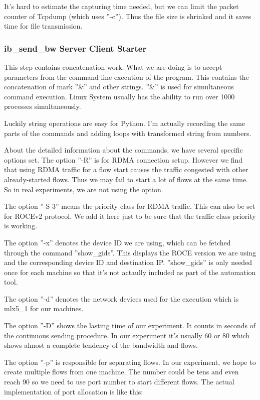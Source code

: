 \documentclass[12pt,a4paper]{article}
\begin{document}
It's hard to estimate the capturing time needed, but we can limit the packet counter of Tcpdump (which uses ''-c'').
Thus the file size is shrinked and it saves time for file transmission.

\subsubsection{ib\_send\_bw Server Client Starter}

This step contains concatenation work.
What we are doing is to accept parameters from the command line execution of the program.
This contains the concatenation of mark ''\&'' and other strings.
''\&'' is used for simultaneous command execution. Linux System usually has the ability to run over 1000 processes simultaneously.

Luckily string operations are easy for Python.
I'm actually recording the same parts of the commands and adding loops with transformed string from numbers.

About the detailed information about the commands, we have several specific options set.
The option ''-R'' is for RDMA connection setup. However we find that using RDMA traffic for a flow start causes
the traffic congested with other already-started flows. Thus we may fail to start a lot of flows at the same time.
So in real experiments, we are not using the option.

The option ''-S 3'' means the priority class for RDMA traffic. This can also be set for ROCEv2 protocol.
We add it here just to be sure that the traffic class priority is working.

The option ''-x'' denotes the device ID we are using, which can be fetched through the command ''show\_gids''.
This displays the ROCE version we are using and the corresponding device ID and destination IP.
''show\_gids'' is only needed once for each machine so that it's not actaully included as part of the automation tool.

The option ''-d'' denotes the network devices used for the execution which is mlx5\_1 for our machines.

The option ''-D'' shows the lasting time of our experiment. It counts in seconds of the continuous sending procedure.
In our experiment it's usually 60 or 80 which shows almost a complete tendency of the bandwidth and flows.

The option ''-p'' is responsible for separating flows. In our experiment, we hope to create multiple flows from one machine.
The number could be tens and even reach 90 so we need to use port number to start different flows.
The actual implementation of port allocation is like this: 
\end{document}
